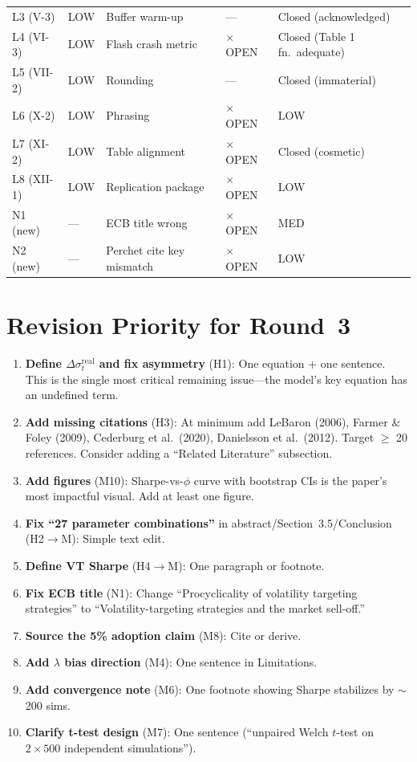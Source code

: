\documentclass[12pt,a4paper]{article}
\newcommand{\OPEN}{\textcolor{errorred}{$\times$ OPEN}}
\begin{document}
{\begin{longtable}{@{}p{1.2cm}p{1.2cm}p{5cm}p{1.5cm}p{3.5cm}@{}}
L3 (V-3) & LOW & Buffer warm-up & --- & Closed (acknowledged) \\
L4 (VI-3) & LOW & Flash crash metric & \OPEN & Closed (Table 1 fn.\ adequate) \\
L5 (VII-2) & LOW & Rounding & --- & Closed (immaterial) \\
L6 (X-2) & LOW & Phrasing & \OPEN & \textcolor{okgreen}{LOW} \\
L7 (XI-2) & LOW & Table alignment & \OPEN & Closed (cosmetic) \\
L8 (XII-1) & LOW & Replication package & \OPEN & \textcolor{okgreen}{LOW} \\
\midrule
N1 (new) & --- & ECB title wrong & \OPEN & \textcolor{warncolor}{MED} \\
N2 (new) & --- & Perchet cite key mismatch & \OPEN & \textcolor{okgreen}{LOW} \\
\bottomrule
\end{longtable}
}


\section*{Revision Priority for Round~3}

\begin{enumerate}
  \item \textbf{Define $\Delta\sigma^{\text{real}}_t$ and fix asymmetry} (H1): One equation + one sentence. This is the single most critical remaining issue---the model's key equation has an undefined term.
  \item \textbf{Add missing citations} (H3): At minimum add LeBaron (2006), Farmer \& Foley (2009), Cederburg et al.\ (2020), Danielsson et al.\ (2012). Target $\geq$ 20 references. Consider adding a ``Related Literature'' subsection.
  \item \textbf{Add figures} (M10): Sharpe-vs-$\phi$ curve with bootstrap CIs is the paper's most impactful visual. Add at least one figure.
  \item \textbf{Fix ``27 parameter combinations''} in abstract/Section~3.5/Conclusion (H2$\to$M): Simple text edit.
  \item \textbf{Define VT Sharpe} (H4$\to$M): One paragraph or footnote.
  \item \textbf{Fix ECB title} (N1): Change ``Procyclicality of volatility targeting strategies'' to ``Volatility-targeting strategies and the market sell-off.''
  \item \textbf{Source the 5\% adoption claim} (M8): Cite or derive.
  \item \textbf{Add $\lambda$ bias direction} (M4): One sentence in Limitations.
  \item \textbf{Add convergence note} (M6): One footnote showing Sharpe stabilizes by $\sim$200 sims.
  \item \textbf{Clarify t-test design} (M7): One sentence (``unpaired Welch $t$-test on $2 \times 500$ independent simulations'').
\end{enumerate}
\end{document}
